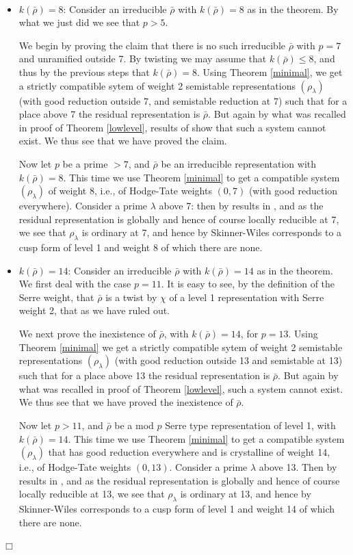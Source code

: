 \documentclass[12pt]{article}
\newcommand{\rhobar}{\overline{\rho}}
\newenvironment{proof}{\smallskip\noindent{\bf Proof.}\
}{$\Box$\smallskip\goodbreak}
\def\rhobar{ {\bar {\rho} } }
\def\rhob{ {\bar {\rho} } }
\begin{document}
\begin{proof}
\begin{itemize}
\item $k(\rhob)=8$: Consider an irreducible $\rhob$ with $k(\rhob)=8$
  as in the theorem.
By what we just did we see that $p>5$.

We begin by proving the claim that there is no such irreducible
$\rhob$ with $p=7$ and unramified outside 7.
By twisting we may assume
that $k(\rhobar) \leq 8$, and thus by the previous steps that $k(\rhobar)=8$. 
Using Theorem
\ref{minimal}, we get a strictly compatible sytem of weight 2
semistable representations $(\rho_\lambda)$ (with good reduction
outside 7, and semistable reduction at 7)
such that for a place above 7 the residual representation is
$\rhob$. But again by what was recalled in proof of
Theorem \ref{lowlevel}, results of \cite{Schoof1} show that
such a system cannot exist.
We thus see that we have proved the claim.

Now let $p$ be a prime $>7$, and $\rhob$ be an irreducible
representation with $k(\rhob)=8$. This time we use Theorem
\ref{minimal} to get a compatible system $(\rho_\lambda)$ of weight 8, i.e.,
of
Hodge-Tate weights
$(0,7)$ (with good reduction everywhere).
Consider a prime $\lambda$ above 7: then by results in \cite{BLZ},
and as the residual representation is globally and hence of course locally
reducible at 7, we see that
$\rho_\lambda$ is ordinary at 7, and hence by Skinner-Wiles corresponds
to a cusp form of level 1 and weight 8 of which there are none.

\item $k(\rhob)=14$: Consider an irreducible
$\rhob$ with $k(\rhob)=14$ as in the theorem.
We first deal with the case $p=11$. It is easy to see, by the definition of
the
Serre weight, that $\rhob$ is
a twist by $\chi$ of a level 1 representation with Serre weight 2,  that as
we
have ruled out.


We next prove the inexistence of $\rhob$, with
$k(\rhob)=14$,
for $p=13$.
Using Theorem \ref{minimal}
we get a strictly compatible sytem of weight 2
semistable representations $(\rho_\lambda)$ (with good reduction
outside 13 and semistable at 13)
such that for a place above 13 the residual representation is
$\rhob$. But again by what was recalled in proof of
Theorem \ref{lowlevel}, such a system cannot exist.
We thus see that we have proved the inexistence of  $\rhob$.

Now let $p > 11$, and $\rhob$ be a mod $p$ Serre type
representation of level 1, with $k(\rhob)=14$. This time we use Theorem
\ref{minimal} to get a compatible system $(\rho_\lambda)$ that has good
reduction everywhere and is crystalline of weight 14, i.e., of
Hodge-Tate weights $(0,13)$.
Consider a prime $\lambda$ above 13. Then by results in \cite{BLZ},
and as the residual representation is globally and hence of course locally
reducible at 13, we see that
$\rho_\lambda$ is ordinary at 13, and hence by Skinner-Wiles \cite{SW2}
corresponds
to a cusp form of level 1 and weight 14 of which there are none.

\end{itemize}

\end{proof}
\end{document}
